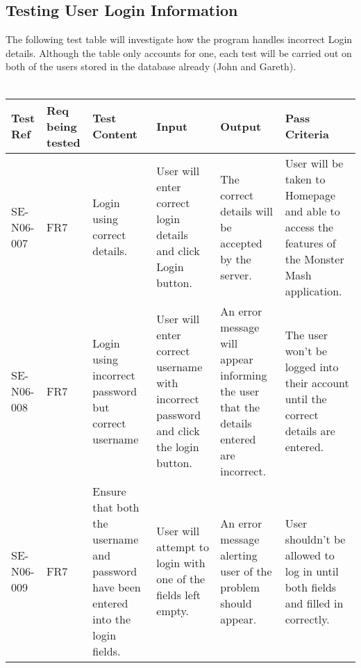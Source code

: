 \documentclass[titlepage]{article}
\begin{document}
\subsection {Testing User Login Information}
The following test table will investigate how the program handles incorrect Login details. Although the table only accounts for one, each test will be carried out on both of the users stored in the database already (John and Gareth). \\
\\
{\centering
\begin{tabular}{|p{1cm}|p{1cm}|p{3cm}|p{2cm}|p{2cm}|p{3cm}|}
\hline
Test Ref & Req being tested & Test Content & Input & Output & Pass Criteria \\ 
\hline
SE-N06-007 & FR7 & Login using correct details. & User will enter correct login details and click Login button. & The correct details will be accepted by the server. & User will be taken to Homepage and able to access the features of the Monster Mash application. \\
\hline
SE-N06-008 & FR7 & Login using incorrect password but correct username & User will enter correct username with incorrect password and click the login button. & An error message will appear informing the user that the details entered are incorrect. & The user won't be logged into their account until the correct details are entered. \\
\hline
SE-N06-009 & FR7 & Ensure that both the username and password have been entered into the login fields. & User will attempt to login with one of the fields left empty. & An error message alerting user of the problem should appear. & User shouldn't be allowed to log in until both fields and filled in correctly.\\
\hline 
\end{tabular}}
\newpage
\end{document}
